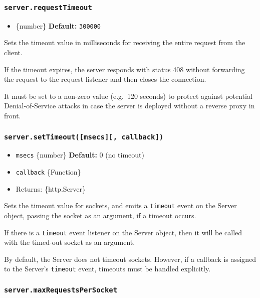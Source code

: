 \subsubsection{\texorpdfstring{\texttt{server.requestTimeout}}{server.requestTimeout}}\label{server.requesttimeout}

\begin{itemize}
\tightlist
\item
  \{number\} \textbf{Default:} \texttt{300000}
\end{itemize}

Sets the timeout value in milliseconds for receiving the entire request
from the client.

If the timeout expires, the server responds with status 408 without
forwarding the request to the request listener and then closes the
connection.

It must be set to a non-zero value (e.g.~120 seconds) to protect against
potential Denial-of-Service attacks in case the server is deployed
without a reverse proxy in front.

\subsubsection{\texorpdfstring{\texttt{server.setTimeout({[}msecs{]}{[},\ callback{]})}}{server.setTimeout({[}msecs{]}{[}, callback{]})}}\label{server.settimeoutmsecs-callback}

\begin{itemize}
\tightlist
\item
  \texttt{msecs} \{number\} \textbf{Default:} 0 (no timeout)
\item
  \texttt{callback} \{Function\}
\item
  Returns: \{http.Server\}
\end{itemize}

Sets the timeout value for sockets, and emits a
\texttt{\textquotesingle{}timeout\textquotesingle{}} event on the Server
object, passing the socket as an argument, if a timeout occurs.

If there is a \texttt{\textquotesingle{}timeout\textquotesingle{}} event
listener on the Server object, then it will be called with the timed-out
socket as an argument.

By default, the Server does not timeout sockets. However, if a callback
is assigned to the Server's
\texttt{\textquotesingle{}timeout\textquotesingle{}} event, timeouts
must be handled explicitly.

\subsubsection{\texorpdfstring{\texttt{server.maxRequestsPerSocket}}{server.maxRequestsPerSocket}}\label{server.maxrequestspersocket}

